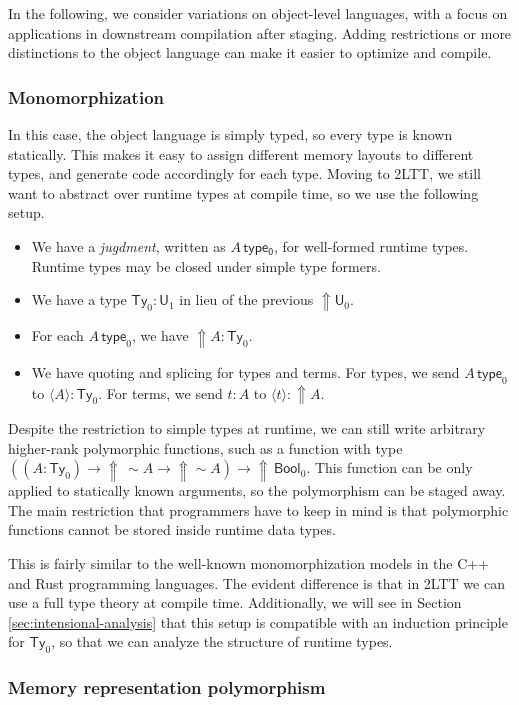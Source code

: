 \documentclass[acmsmall,review]{acmart}
\newcommand{\msf}[1]{\mathsf{#1}}
\newcommand{\Lift}{{\Uparrow}}
\newcommand{\spl}{{\sim}}
\newcommand{\qut}[1]{\langle #1\rangle}
\renewcommand{\U}{\msf{U}}
\newcommand{\Ty}{\msf{Ty}}
\newcommand{\Bool}{\msf{Bool}}
\theoremstyle{remark}
\begin{document}
In the following, we consider variations on object-level languages, with a focus
on applications in downstream compilation after staging. Adding restrictions or
more distinctions to the object language can make it easier to optimize and
compile.

\subsubsection{Monomorphization}\label{sec:monomorphization}

In this case, the object language is simply typed, so every type is known
statically. This makes it easy to assign different memory layouts to different
types, and generate code accordingly for each type. Moving to 2LTT, we still
want to abstract over runtime types at compile time, so we use the following
setup.
\begin{itemize}
\item We have a \emph{jugdment}, written as $A\,\msf{type_0}$, for well-formed
  runtime types. Runtime types may be closed under simple type formers.
\item We have a type $\Ty_0 : \U_1$ in lieu of the previous $\Lift \U_0$.
\item For each $A\,\msf{type}_0$, we have $\Lift A : \Ty_0$.
\item We have quoting and splicing for types and terms. For types, we send $A\,
  \msf{type}_0$ to $\qut{A} : \Ty_0$. For terms, we send $t : A$ to $\qut{t} :
  \Lift A$.
\end{itemize}
Despite the restriction to simple types at runtime, we can still write arbitrary
higher-rank polymorphic functions, such as a function with type $((A : \Ty_0)
\to \Lift\,\spl A \to \Lift \spl A) \to \Lift\,\Bool_0$. This function can be
only applied to statically known arguments, so the polymorphism can be staged
away. The main restriction that programmers have to keep in mind is that
polymorphic functions cannot be stored inside runtime data types.

This is fairly similar to the well-known monomorphization models in the
C++ and Rust programming languages. The evident difference is that in 2LTT we
can use a full type theory at compile time. Additionally, we will see in Section
\ref{sec:intensional-analysis} that this setup is compatible with an induction principle for
$\Ty_0$, so that we can analyze the structure of runtime types.

\subsubsection{Memory representation polymorphism}
\end{document}
